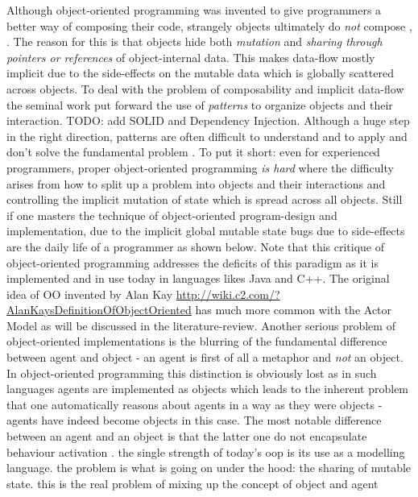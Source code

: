 Although object-oriented programming was invented to give programmers a better way of composing their code, strangely objects ultimately do \textit{not} compose \cite{bill_what_2017}, \cite{erkki_lindpere_why_2013}. The reason for this is that objects hide both \textit{mutation} and \textit{sharing through pointers or references} of object-internal data. This makes data-flow mostly implicit due to the side-effects on the mutable data which is globally scattered across objects. To deal with the problem of composability and implicit data-flow the seminal work \cite{gamma_design_1994} put forward the use of \textit{patterns} to organize objects and their interaction. TODO: add SOLID and Dependency Injection. Although a huge step in the right direction, patterns are often difficult to understand and to apply and don't solve the fundamental problem \cite{lawrence_krubner_object_2014}. To put it short: even for experienced programmers, proper object-oriented programming \textit{is hard} where the difficulty arises from how to split up a problem into objects and their interactions and controlling the implicit mutation of state which is spread across all objects. Still if one masters the technique of object-oriented program-design and implementation, due to the implicit global mutable state bugs due to side-effects are the daily life of a programmer as shown below. Note that this critique of object-oriented programming addresses the deficits of this paradigm as it is implemented and in use today in languages likes Java and C++. The original idea of OO invented by Alan Kay \url{http://wiki.c2.com/?AlanKaysDefinitionOfObjectOriented} has much more common with the Actor Model as will be discussed in the literature-review.
Another serious problem of object-oriented implementations is the blurring of the fundamental difference between agent and object - an agent is first of all a metaphor and \textit{not} an object. In object-oriented programming this distinction is obviously lost as in such languages agents are implemented as objects which leads to the inherent problem that one automatically reasons about agents in a way as they were objects - agents have indeed become objects in this case. The most notable difference between an agent and an object is that the latter one do not encapsulate behaviour activation \cite{jennings_agent-based_2000}.
the single strength of today's oop is its use as a modelling language. the problem is what is going on under the hood: the sharing of mutable state. this is the real problem of mixing up the concept of object and agent

